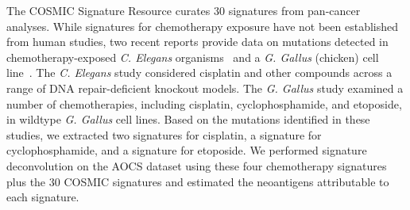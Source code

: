 The COSMIC Signature Resource curates 30 signatures from pan-cancer analyses. While signatures for chemotherapy exposure have not been established from human studies, two recent reports provide data on mutations detected in chemotherapy-exposed \textit{C. Elegans} organisms~\cite{Meier_2014} and a \textit{G. Gallus} (chicken) cell line~\cite{Szikriszt_2016}. The \textit{C. Elegans} study considered cisplatin and other compounds across a range of DNA repair-deficient knockout models. The \textit{G. Gallus} study examined a number of chemotherapies, including cisplatin, cyclophosphamide, and etoposide, in wildtype \textit{G. Gallus} cell lines. Based on the mutations identified in these studies, we extracted two signatures for cisplatin, a signature for cyclophosphamide, and a signature for etoposide. We performed signature deconvolution on the AOCS dataset using these four chemotherapy signatures plus the 30 COSMIC signatures and estimated the neoantigens attributable to each signature.




